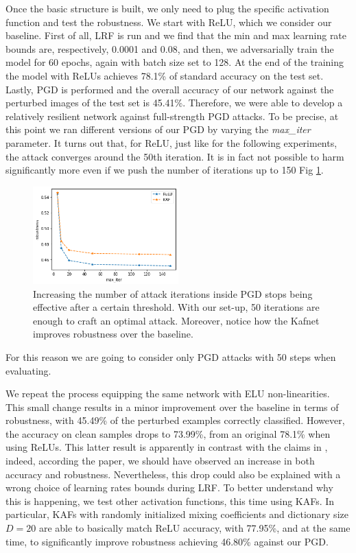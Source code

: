 \documentclass[LaM,binding=0.6cm]{./packages/sapthesis/sapthesis}
\begin{document}
        Once the basic structure is built, we only need to plug the specific activation function and test the robustness.
        We start with ReLU, which we consider our baseline. First of all, LRF is run and we find that the min and max learning rate bounds are,
        respectively, 0.0001 and 0.08, and then, we adversarially train the model for 60 epochs, again with batch size set to 128. At the end of the training the model with ReLUs achieves 78.1\% of standard accuracy 
        on the test set. Lastly, PGD is performed and the overall accuracy of our network against the perturbed images of the test set is 45.41\%. Therefore, we were able to
        develop a relatively resilient network against full-strength PGD attacks. To be precise, 
        at this point we ran different versions of our PGD by varying the \textit{max\_iter} parameter. It turns out that, for ReLU, just like for 
        the following experiments, the attack converges around the 50th iteration. It is in fact not possible to harm significantly more even if we push 
        the number of iterations up to 150 Fig \ref{fig:pgditers}.
        \begin{figure}[h!]
            \centering
            \includegraphics[width=0.50\textwidth]{pgditers.png}
            \caption{Increasing the number of attack iterations inside PGD stops being effective after a certain threshold. With our set-up, 50 iterations are enough to craft an 
            optimal attack. Moreover, notice how the Kafnet improves robustness over the baseline. }
            \label{fig:pgditers}
        \end{figure}
        For this reason we are going to consider only PGD attacks with 50 steps when evaluating.

        We repeat the process equipping the same network with ELU non-linearities. This small change results in a minor improvement over the baseline in terms of robustness, with 45.49\% 
        of the perturbed examples correctly classified. However, the accuracy on clean samples drops to 73.99\%, from an original 78.1\% when using ReLUs. This latter result is 
        apparently in contrast with the claims in \cite{smooth_adversarial_training}, indeed, according the paper, we should have observed an increase in both accuracy and robustness. Nevertheless, this drop could also be explained with a wrong choice of learning rates bounds during LRF. 
        To better understand why this is happening, we test other activation functions, this time using KAFs. In particular, KAFs with randomly initialized mixing 
        coefficients and dictionary size $D=20$ are able to basically match ReLU accuracy, with 77.95\%, and at the same time, to significantly improve robustness achieving 46.80\%
        against our PGD.
\end{document}
